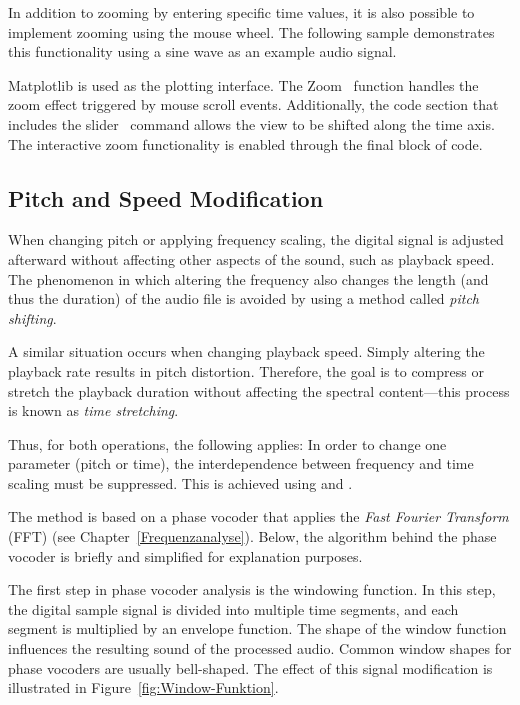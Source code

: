 In addition to zooming by entering specific time values, it is also possible to implement zooming using the mouse wheel.  
The following sample demonstrates this functionality using a sine wave as an example audio signal.

\begin{code}[!htp]
	\caption{Interactive audio waveform plot with zoom and scroll functionality using matplotlib} 
	\label{Code:Python:File:audioWaveformSliderZoom}
\end{code}

Matplotlib is used as the plotting interface.  
The \glqq Zoom\grqq~ function handles the zoom effect triggered by mouse scroll events.  
Additionally, the code section that includes the \glqq slider\grqq~ command allows the view to be shifted along the time axis.  
The interactive zoom functionality is enabled through the final block of code.

\subsection{Pitch and Speed Modification}

When changing pitch or applying frequency scaling, the digital signal is adjusted afterward without affecting other aspects of the sound, such as playback speed.  
The phenomenon in which altering the frequency also changes the length (and thus the duration) of the audio file is avoided by using a method called \textit{pitch shifting}.

A similar situation occurs when changing playback speed.  
Simply altering the playback rate results in pitch distortion.  
Therefore, the goal is to compress or stretch the playback duration without affecting the spectral content—this process is known as \textit{time stretching}.

Thus, for both operations, the following applies:  
In order to change one parameter (pitch or time), the interdependence between frequency and time scaling must be suppressed.  
This is achieved using  and .

The method is based on a phase vocoder that applies the \textit{Fast Fourier Transform} (FFT) (see Chapter~\ref{Frequenzanalyse}).  
Below, the algorithm behind the phase vocoder is briefly and simplified for explanation purposes.

The first step in phase vocoder analysis is the windowing function.  
In this step, the digital sample signal is divided into multiple time segments, and each segment is multiplied by an envelope function.  
The shape of the window function influences the resulting sound of the processed audio.  
Common window shapes for phase vocoders are usually bell-shaped.  
The effect of this signal modification is illustrated in Figure~\ref{fig:Window-Funktion}.


